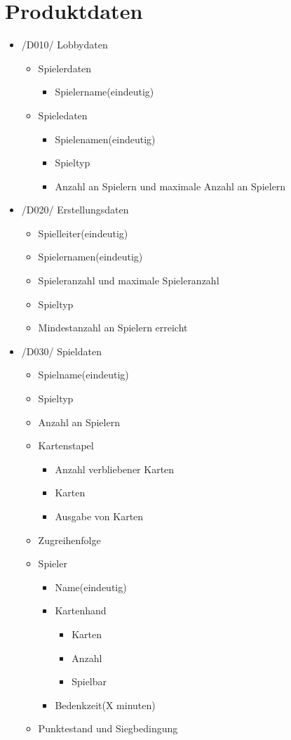 \documentclass{article}
\begin{document}
\section{Produktdaten}

\begin{itemize}
	\item /D010/ \gls{Lobby}daten
	 \begin{itemize}
	 	\item Spielerdaten
	 	\begin{itemize}
	 		\item Spielername(eindeutig)
	 	\end{itemize}
	 	\item Spieledaten
	 	\begin{itemize}
	 		\item Spielenamen(eindeutig)
	 		\item Spieltyp
	 		\item Anzahl an Spielern und maximale Anzahl an Spielern
	 	\end{itemize}
	 \end{itemize}
	 \item /D020/ Erstellungsdaten
	 \begin{itemize}
	 	\item \gls{Spielleiter}(eindeutig)
	 	\item Spielernamen(eindeutig)
	 	\item Spieleranzahl und maximale Spieleranzahl
	 	\item Spieltyp
	 	\item Mindestanzahl an Spielern erreicht
	 \end{itemize}
	 \item /D030/ Spieldaten
	 \begin{itemize}
	 	\item Spielname(eindeutig)
	 	\item Spieltyp
	 	\item Anzahl an Spielern
	 	\item Kartenstapel
	 	\begin{itemize}
	 		\item Anzahl verbliebener Karten
	 		\item Karten
	 		\item Ausgabe von Karten
	 	\end{itemize}
	 	\item Zugreihenfolge
	 	\item Spieler
	 	\begin{itemize}
	 		\item Name(eindeutig)
	 		\item Kartenhand
	 		\begin{itemize}
	 			\item Karten
	 			\item Anzahl
	 			\item Spielbar
	 		\end{itemize}	 
	 		\item Bedenkzeit(X minuten)		
	 	\end{itemize}
	 	\item Punktestand und Siegbedingung
	 \end{itemize}
\end{itemize}
\end{document}
